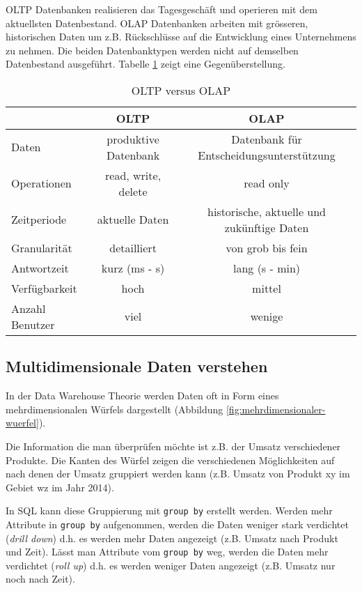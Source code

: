 \ac{OLTP} Datenbanken realisieren das Tagesgeschäft und operieren mit dem aktuellsten Datenbestand. \ac{OLAP} Datenbanken arbeiten mit grösseren, historischen Daten um z.B. Rückschlüsse auf die Entwicklung eines Unternehmens zu nehmen. Die beiden Datenbanktypen werden nicht auf demselben Datenbestand ausgeführt. Tabelle \ref{tab:oltp-olap} zeigt eine Gegenüberstellung.

\begin{table}[h!]
	\centering
	\begin{tabular}{|l|c|c|}
		\hline  				& \ac{OLTP} 			& \ac{OLAP} 									\\ 
		\hline Daten 			& produktive Datenbank 	& Datenbank für Entscheidungsunterstützung 		\\ 
		\hline Operationen		& read, write, delete  	& read only 									\\
		\hline Zeitperiode 		& aktuelle Daten 		& historische, aktuelle und zukünftige Daten 	\\ 
		\hline Granularität 	& detailliert 			& von grob bis fein 							\\ 
		\hline Antwortzeit 		& kurz (ms - s) 		& lang (s - min) 								\\ 
		\hline Verfügbarkeit 	& hoch 					& mittel 										\\ 
		\hline Anzahl Benutzer 	& viel 					& wenige 										\\ 
		\hline 
	\end{tabular}
	\caption{OLTP versus OLAP}
	\label{tab:oltp-olap}
\end{table}

\subsection{Multidimensionale Daten verstehen}

In der Data Warehouse Theorie werden Daten oft in Form eines mehrdimensionalen Würfels dargestellt (Abbildung \ref{fig:mehrdimensionaler-wuerfel}).


Die Information die man überprüfen möchte ist z.B. der Umsatz verschiedener Produkte. Die Kanten des Würfel zeigen die verschiedenen Möglichkeiten auf nach denen der Umsatz gruppiert werden kann (z.B. Umsatz von Produkt xy im Gebiet wz im Jahr 2014). 

In SQL kann diese Gruppierung mit \texttt{group by} erstellt werden. Werden mehr Attribute in \texttt{group by} aufgenommen, werden die Daten weniger stark verdichtet (\emph{drill down}) d.h. es werden mehr Daten angezeigt (z.B. Umsatz nach Produkt und Zeit). Lässt man Attribute vom \texttt{group by} weg, werden die Daten mehr verdichtet (\emph{roll up}) d.h. es werden weniger Daten angezeigt (z.B. Umsatz nur noch nach Zeit).

